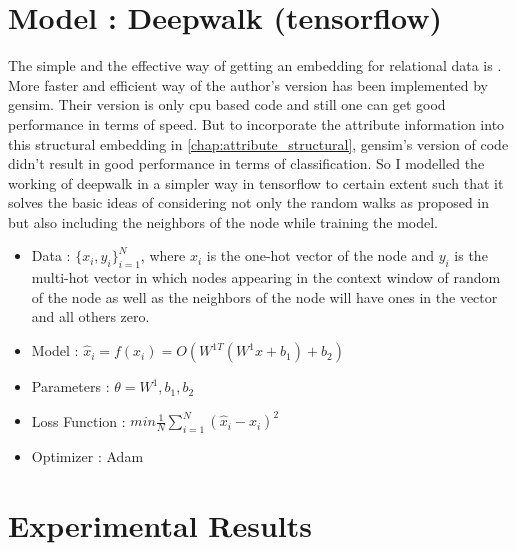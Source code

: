 \section{Model : Deepwalk (tensorflow)}
The simple and the effective way of getting an embedding for relational data is  \cite{deepwalk}. More faster and efficient way of the author's version has been implemented by gensim. Their version is only cpu based code and still one can get good performance in terms of speed. But to incorporate the attribute information into this structural embedding in \ref{chap:attribute_structural}, gensim's version of code didn't result in good performance in terms of classification. So I modelled the working of deepwalk in a simpler way in tensorflow to certain extent such that it solves the basic ideas of \cite{word2vec} considering not only the random walks as proposed in \cite{deepwalk} but also including the neighbors of the node while training the model.
\par
\begin{itemize}
    \item Data : $ \{x_{i},y_{i}\}^{N}_{i=1} $, where $x_{i}$ is the one-hot vector of the node and $y_{i}$ is the multi-hot vector in which nodes appearing in the context window of random of the node as well as the neighbors of the node will have ones in the vector and all others zero.
    \item Model : $ \hat{x}_{i} = f(x_{i}) = O(W^{1 T}(W^{1}x+b_{1})+b_{2}) $
    \item Parameters : $\theta = W^{1}, b_{1}, b_{2} $
    \item Loss Function : $
        min \frac{1}{N} \sum_{i=1}^{N}(\hat{x}_{i}-x_{i})^2
        $
    \item Optimizer : Adam 
\end{itemize}

\section{Experimental Results}
